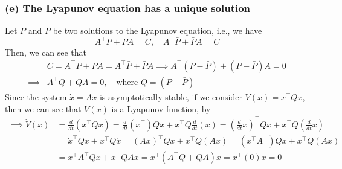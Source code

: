 \subsubsection*{(e) The Lyapunov equation has a unique solution}

Let \( P \) and \( \bar{P} \) be two solutions to the Lyapunov equation, i.e., we have
\begin{equation*}
    A^\top P + P A = C,
    \quad
    A^\top \bar{P} + \bar{P} A = C
\end{equation*}
Then, we can see that
\begin{align*}
     &
    C
    =
    A^\top P + P A
    =
    A^\top \bar{P} + \bar{P} A
    \implies
    A^\top (P - \bar{P}) + (P - \bar{P}) A
    =
    0
    \\
    \implies
     &
    A^\top Q + Q A
    =
    0,
    \quad \text{where } Q = (P - \bar{P})
\end{align*}
Since the system \( \dot x = A x \) is asymptotically stable, if we consider \( V(x) = x^\top Q x \), then we can see that \( V(x) \) is a Lyapunov function, by
\begin{align*}
    \implies
    \dot V(x)
     & =
    \frac{d}{dt} \left( x^\top Q x \right)
    =
    \frac{d}{dt} \left( x^\top \right) Q x + x^\top Q \frac{d}{dt} \left( x \right)
    =
    {\left(\frac{d}{dt} x \right)}^\top Q x + x^\top Q {\left(\frac{d}{dt} x \right)}
    \\ & =
    {\dot x}^\top Q x + x^\top Q \dot x
    =
    {\left( A x \right)}^\top Q x + x^\top Q \left( A x \right)
    =
    \left( x^\top A^\top \right) Q x + x^\top Q \left( A x \right)
    \\ & =
    x^\top A^\top Q x + x^\top Q A x
    =
    x^\top \left( A^\top Q + Q A \right) x
    =
    x^\top \left( 0 \right) x
    =
    0
\end{align*}
